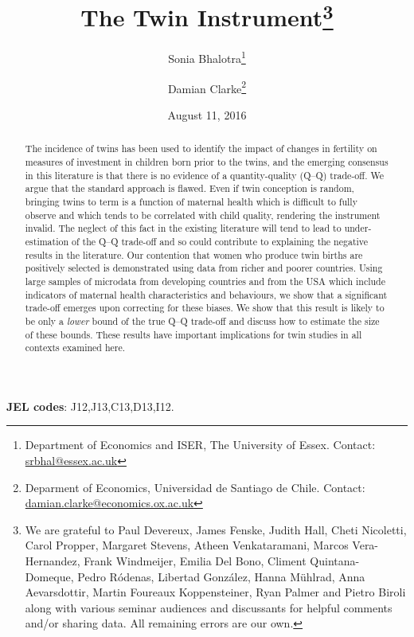 \documentclass[subeqn]{article}
\title{The Twin Instrument\footnote{We are grateful to Paul Devereux, James 
    Fenske, Judith Hall, Cheti Nicoletti, Carol Propper, Margaret Stevens,
    Atheen Venkataramani, Marcos Vera-Hernandez, Frank Windmeijer,
    Emilia Del Bono, Climent Quintana-Domeque, Pedro R\'odenas, Libertad
    Gonz\'alez, Hanna M\"uhlrad, Anna Aevarsdottir, Martin Foureaux
    Koppensteiner, Ryan Palmer and Pietro Biroli along with various seminar
    audiences and discussants for helpful comments and/or sharing data. All
    remaining errors are our own.}}
\author{Sonia Bhalotra\thanks{Department of Economics and ISER, The University of
    Essex. Contact: \href{mailto:srbhal@essex.ac.uk}{srbhal@essex.ac.uk}} 
\and Damian Clarke\thanks{Deparment of Economics, Universidad de Santiago de Chile.
Contact: \href{mailto:damian.clarke@usach.cl}
{damian.clarke@economics.ox.ac.uk}}}
\date{August 11, 2016}
\begin{document}
\begin{spacing}{1.4}

\maketitle
\vspace{-1cm}
\begin{abstract}
 The incidence of twins has been used to identify the impact of changes in 
 fertility on measures of investment in children born prior to the twins, and
 the emerging consensus in this literature is that there is no evidence of a
 quantity-quality (Q--Q) trade-off. We argue that the standard approach is 
 flawed. Even if twin conception is random, bringing twins to term is a function 
 of maternal health which is difficult to fully observe and which tends to be
 correlated with child quality, rendering the instrument invalid. The neglect
 of this fact in the existing literature will tend to lead to under-estimation 
 of the Q--Q trade-off and so could contribute to explaining the negative results
 in the literature. Our contention that women who produce twin births are
 positively selected is demonstrated using data from richer and poorer countries.
 Using large samples of microdata from developing countries and from the USA 
 which include indicators of maternal health characteristics and behaviours, we
 show that a significant trade-off emerges upon correcting for these biases. We
 show that this result is likely to be only a \emph{lower} bound of the true
 Q--Q trade-off and discuss how to estimate the size of these bounds. These
 results have important implications for twin studies in all contexts examined
 here.
\\
\end{abstract}
\hspace{4mm}\textbf{\small JEL codes}: J12,J13,C13,D13,I12. \\

\newpage

\end{spacing}
\end{document}
